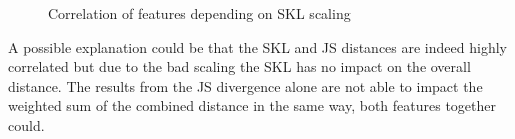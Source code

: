 \begin{figure}[htbp]
	\centering
	\caption{Correlation of features depending on SKL scaling}
	\label{fig:sklsc}
\end{figure}
\FloatBarrier

\noindent A possible explanation could be that the SKL and JS distances are indeed highly correlated but due to the bad scaling the SKL has no impact on the overall distance. The results from the JS divergence alone are not able to impact the weighted sum of the combined distance in the same way, both features together could. 

